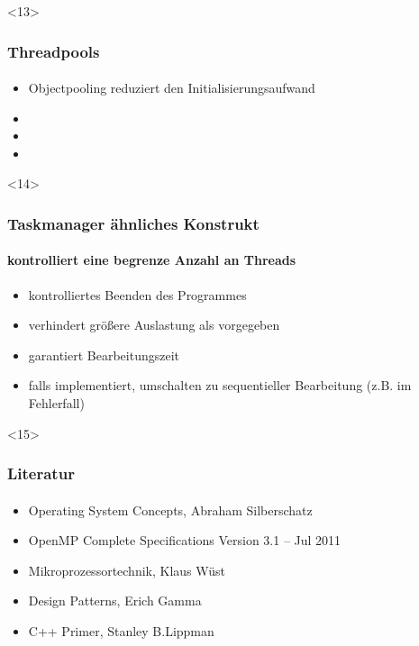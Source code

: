 \documentclass{beamer}
\begin{document}
\begin{frame}<13>
  \frametitle{Threadpools}
  \framesubtitle{}

    \begin{itemize}
    \item  Objectpooling reduziert den Initialisierungsaufwand
    \item  
    \item   
    \item  
  \end{itemize}
  
\end{frame}

\begin{frame}<14>
  \frametitle{Taskmanager ähnliches Konstrukt}
  \framesubtitle{kontrolliert eine begrenze Anzahl an Threads}

    \begin{itemize}
    \item  kontrolliertes Beenden des Programmes
    \item  verhindert größere Auslastung als vorgegeben
    \item  garantiert Bearbeitungszeit 
    \item  falls implementiert, umschalten zu sequentieller Bearbeitung (z.B. im Fehlerfall)
  \end{itemize}
  
\end{frame}

\begin{frame}<15>
  \frametitle{Literatur}
  \framesubtitle{}

    \begin{itemize}
    \item  Operating System Concepts, Abraham Silberschatz 
    \item  OpenMP Complete Specifications Version 3.1 – Jul 2011
    \item  Mikroprozessortechnik, Klaus Wüst 
    \item  Design Patterns, Erich Gamma
    \item  C++ Primer, Stanley B.Lippman
  \end{itemize}
  
\end{frame}
\end{document}
